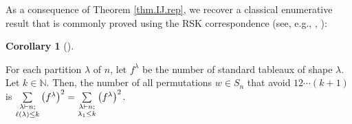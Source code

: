 \documentclass[numbers=enddot,12pt,final,onecolumn,notitlepage]{scrartcl}%
\numberwithin{exer}{subsection}
\theoremstyle{definition}
\newtheorem{coro}[theo]{Corollary}
\newenvironment{corollary}[1][]
{\begin{coro}[#1]\begin{leftbar}}
{\end{leftbar}\end{coro}}
\let\sumnonlimits\sum
\renewcommand{\sum}{\sumnonlimits\limits}
\begin{document}
As a consequence of Theorem \ref{thm.IJ.rep}, we recover a classical
enumerative result that is commonly proved using the RSK correspondence (see,
e.g., \cite[(7.2)]{Bona22}, \cite[Corollary 7.23.12]{Stanley-EC2}):

\begin{corollary}
\label{cor.num-avoid}For each partition $\lambda$ of $n$, let $f^{\lambda}$ be
the number of standard tableaux of shape $\lambda$. Let $k\in\mathbb{N}$.
Then, the number of all permutations $w\in S_{n}$ that avoid $12\cdots\left(
k+1\right)  $ is $\sum\limits_{\substack{\lambda\vdash n;\\\ell\left(
\lambda\right)  \leq k}}\left(  f^{\lambda}\right)  ^{2}=\sum
\limits_{\substack{\lambda\vdash n;\\\lambda_{1}\leq k}}\left(  f^{\lambda
}\right)  ^{2}$.
\end{corollary}
\end{document}
